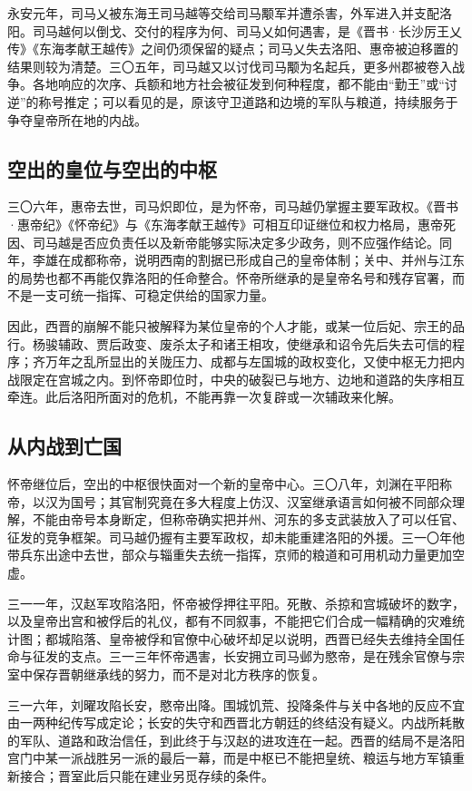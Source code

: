 永安元年，司马乂被东海王司马越等交给司马颙军并遭杀害，外军进入并支配洛阳。司马越何以倒戈、交付的程序为何、司马乂如何遇害，是《晋书·长沙厉王乂传》《东海孝献王越传》之间仍须保留的疑点；司马乂失去洛阳、惠帝被迫移置的结果则较为清楚。三〇五年，司马越又以讨伐司马颙为名起兵，更多州郡被卷入战争。各地响应的次序、兵额和地方社会被征发到何种程度，都不能由“勤王”或“讨逆”的称号推定；可以看见的是，原该守卫道路和边境的军队与粮道，持续服务于争夺皇帝所在地的内战。

\subsection{空出的皇位与空出的中枢}

三〇六年，惠帝去世，司马炽即位，是为怀帝，司马越仍掌握主要军政权。《晋书·惠帝纪》《怀帝纪》与《东海孝献王越传》可相互印证继位和权力格局，惠帝死因、司马越是否应负责任以及新帝能够实际决定多少政务，则不应强作结论。同年，李雄在成都称帝，说明西南的割据已形成自己的皇帝体制；关中、并州与江东的局势也都不再能仅靠洛阳的任命整合。怀帝所继承的是皇帝名号和残存官署，而不是一支可统一指挥、可稳定供给的国家力量。

因此，西晋的崩解不能只被解释为某位皇帝的个人才能，或某一位后妃、宗王的品行。杨骏辅政、贾后政变、废杀太子和诸王相攻，使继承和诏令先后失去可信的程序；齐万年之乱所显出的关陇压力、成都与左国城的政权变化，又使中枢无力把内战限定在宫城之内。到怀帝即位时，中央的破裂已与地方、边地和道路的失序相互牵连。此后洛阳所面对的危机，不能再靠一次复辟或一次辅政来化解。

\subsection{从内战到亡国}

怀帝继位后，空出的中枢很快面对一个新的皇帝中心。三〇八年，刘渊在平阳称帝，以汉为国号；其官制究竟在多大程度上仿汉、汉室继承语言如何被不同部众理解，不能由帝号本身断定，但称帝确实把并州、河东的多支武装放入了可以任官、征发的竞争框架。司马越仍握有主要军政权，却未能重建洛阳的外援。三一〇年他带兵东出途中去世，部众与辎重失去统一指挥，京师的粮道和可用机动力量更加空虚。

三一一年，汉赵军攻陷洛阳，怀帝被俘押往平阳。死散、杀掠和宫城破坏的数字，以及皇帝出宫和被俘后的礼仪，都有不同叙事，不能把它们合成一幅精确的灾难统计图；都城陷落、皇帝被俘和官僚中心破坏却足以说明，西晋已经失去维持全国任命与征发的支点。三一三年怀帝遇害，长安拥立司马邺为愍帝，是在残余官僚与宗室中保存晋朝继承线的努力，而不是对北方秩序的恢复。

三一六年，刘曜攻陷长安，愍帝出降。围城饥荒、投降条件与关中各地的反应不宜由一两种纪传写成定论；长安的失守和西晋北方朝廷的终结没有疑义。内战所耗散的军队、道路和政治信任，到此终于与汉赵的进攻连在一起。西晋的结局不是洛阳宫门中某一派战胜另一派的最后一幕，而是中枢已不能把皇统、粮运与地方军镇重新接合；晋室此后只能在建业另觅存续的条件。


